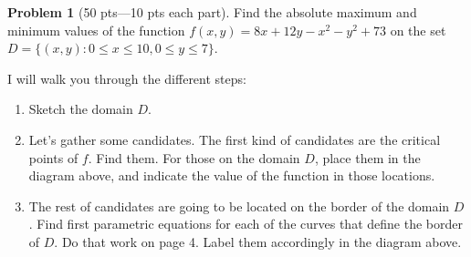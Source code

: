 \documentclass[12pt]{article}
\theoremstyle{definition}
\newtheorem{problem}{Problem}
\begin{document}
\bigskip
\begin{problem}[50 pts---10 pts each part]
Find the absolute maximum and minimum values of the function $f(x,y) = 8x+12y-x^2-y^2+73$ on the set $D = \big\{ (x,y) : 0 \leq x \leq 10, 0 \leq y \leq 7 \big\}$.  

I will walk you through the different steps:
\begin{enumerate}
\item Sketch the domain $D$.

\item Let's gather some candidates.  The first kind of candidates are the critical points of $f$.  Find them.  For those on the domain $D$, place them in the diagram above, and indicate the value of the function in those locations.

\vspace{2cm}
\item The rest of candidates are going to be located on the border of the domain $D$.  Find first parametric equations for each of the curves that define the border of $D$.  Do that work on page 4.  Label them accordingly in the diagram above.


\end{enumerate}
\end{problem}
\end{document}
